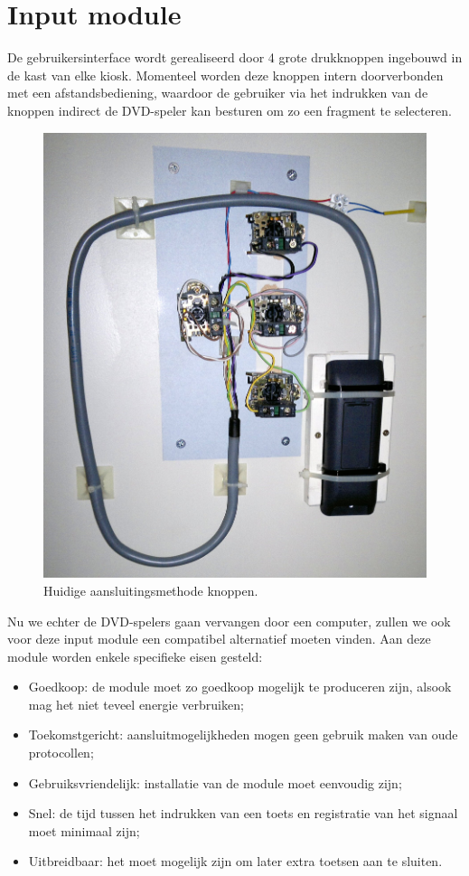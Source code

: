 \section{Input module}
\label{ontwerp:hardware:input}

De gebruikersinterface wordt gerealiseerd door 4 grote drukknoppen ingebouwd in de kast van elke kiosk. Momenteel worden deze knoppen intern doorverbonden met een afstandsbediening, waardoor de gebruiker via het indrukken van de knoppen indirect de DVD-speler kan besturen om zo een fragment te selecteren.

\begin{figure}
	\includegraphics[width=\textwidth]{afbeeldingen/kiosk_knoppen}
	\caption{Huidige aansluitingsmethode knoppen.}
\end{figure}

Nu we echter de DVD-spelers gaan vervangen door een computer, zullen we ook voor deze input module een compatibel alternatief moeten vinden. Aan deze module worden enkele specifieke eisen gesteld:
\begin{itemize}
\item Goedkoop: de module moet zo goedkoop mogelijk te produceren zijn, alsook mag het niet teveel energie verbruiken;
\item Toekomstgericht: aansluitmogelijkheden mogen geen gebruik maken van oude protocollen;
\item Gebruiksvriendelijk: installatie van de module moet eenvoudig zijn;
\item Snel: de tijd tussen het indrukken van een toets en registratie van het signaal moet minimaal zijn;
\item Uitbreidbaar: het moet mogelijk zijn om later extra toetsen aan te sluiten.
\end{itemize}

